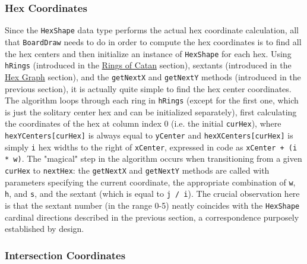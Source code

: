 \documentclass[pageno]{jpaper}
\begin{document}
\begin{doublespacing}
\hypertarget{sec:hex_coordinates}{}
\subsubsection{Hex Coordinates}

Since the \lstinline$HexShape$ data type performs the actual hex coordinate calculation, all that \lstinline$BoardDraw$ needs to do in order to compute the hex coordinates is to find all the hex centers and then initialize an instance of \lstinline$HexShape$ for each hex. Using \lstinline$hRings$ (introduced in the \hyperlink{sec:rings_of_catan}{Rings of Catan} section), sextants (introduced in the \hyperlink{sec:hex_graph}{Hex Graph} section), and the \lstinline$getNextX$ and \lstinline$getNextY$ methods (introduced in the previous section), it is actually quite simple to find the hex center coordinates. The algorithm loops through each ring in \lstinline$hRings$ (except for the first one, which is just the solitary center hex and can be initialized separately), first calculating the coordinates of the hex at column index 0 (i.e. the initial \lstinline$curHex$), where \lstinline$hexYCenters[curHex]$ is always equal to \lstinline$yCenter$ and \lstinline$hexXCenters[curHex]$ is simply \lstinline$i$ hex widths to the right of \lstinline$xCenter$, expressed in code as \lstinline$xCenter + (i * w)$. The "magical" step in the algorithm occurs when transitioning from a given \lstinline$curHex$ to \lstinline$nextHex$: the \lstinline$getNextX$ and \lstinline$getNextY$ methods are called with parameters specifying the current coordinate, the appropriate combination of \lstinline$w$, \lstinline$h$, and \lstinline$s$, and the sextant (which is equal to \lstinline$j / i$). The crucial observation here is that the sextant number (in the range 0-5) neatly coincides with the \lstinline$HexShape$ cardinal directions described in the previous section, a correspondence purposely established by design.

\hypertarget{sec:intersection_coordinates}{}
\subsubsection{Intersection Coordinates}


\end{doublespacing}
\end{document}
